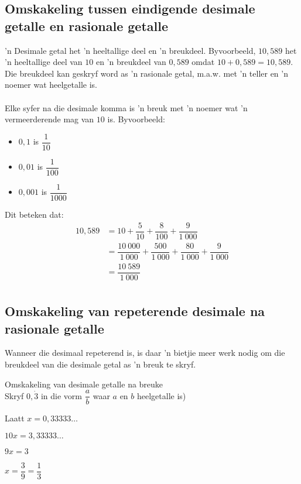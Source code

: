 \subsection*{Omskakeling tussen eindigende desimale getalle en rasionale getalle}
’n Desimale getal het ’n heeltallige deel en ’n breukdeel. Byvoorbeeld, $10,589$ het ’n heeltallige deel van $10$ en ’n
breukdeel van $0,589$ omdat $10+0,589=10,589$. Die breukdeel kan geskryf word as ’n rasionale getal, m.a.w.
met ’n teller en ’n noemer wat heelgetalle is. \\
\\
Elke syfer na die desimale komma is ’n breuk met ’n noemer wat ’n vermeerderende mag van $10$ is. Byvoorbeeld: 
\begin{itemize}
 \item $0,1$ is $\dfrac{1}{10}$
\item $0,01$ is $\dfrac{1}{100}$
\item $0,001$ is $\dfrac{1}{1000}$
\end{itemize}

Dit beteken dat:
\begin{align*}
  10,589 &= 10 + \dfrac{5}{10} + \dfrac{8}{100} + \dfrac{9}{1~000} \\
  &= \dfrac{10~000}{1~000} + \dfrac{500}{1~000} + \dfrac{80}{1~000} + \dfrac{9}{1~000} \\
  &= \dfrac{10~589}{1~000} \\
\end{align*}

\subsection*{Omskakeling van repeterende desimale na rasionale getalle}


Wanneer die desimaal repeterend is, is daar ’n bietjie meer werk nodig om die breukdeel van die desimale getal
as ’n breuk te skryf.\par 

\begin{wex}
{%
Omskakeling van  desimale getalle na breuke
}
{%
\\
Skryf $0,\dot{3}$ in die vorm $\dfrac{a}{b}$ waar $a$ en $b$ heelgetalle is)
}
{%

Laatt $x = 0,33333\ldots$



$10x = 3,33333\ldots$



$9x = 3 $


$ x = \dfrac{3}{9} = \dfrac{1}{3} $
}
\end{wex}


